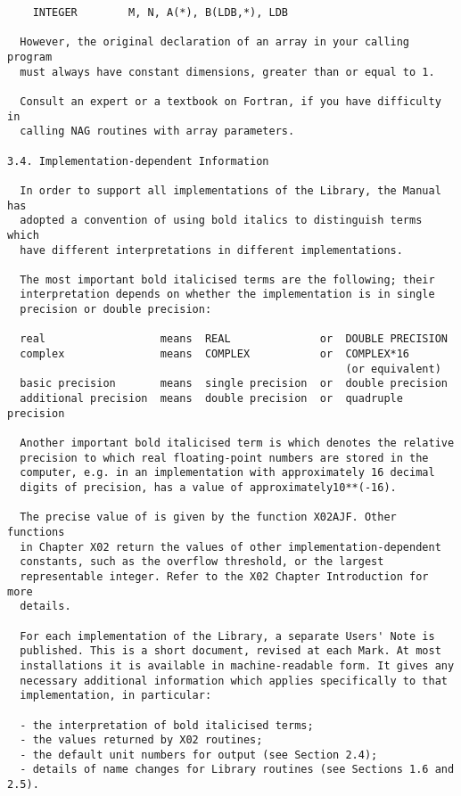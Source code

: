 \begin{verbatim}
    INTEGER        M, N, A(*), B(LDB,*), LDB
 
  However, the original declaration of an array in your calling program
  must always have constant dimensions, greater than or equal to 1.
 
  Consult an expert or a textbook on Fortran, if you have difficulty in
  calling NAG routines with array parameters.
 
3.4. Implementation-dependent Information
 
  In order to support all implementations of the Library, the Manual has
  adopted a convention of using bold italics to distinguish terms which
  have different interpretations in different implementations.
 
  The most important bold italicised terms are the following; their
  interpretation depends on whether the implementation is in single
  precision or double precision:
 
  real                  means  REAL              or  DOUBLE PRECISION
  complex               means  COMPLEX           or  COMPLEX*16
                                                     (or equivalent)
  basic precision       means  single precision  or  double precision
  additional precision  means  double precision  or  quadruple precision
 
  Another important bold italicised term is which denotes the relative
  precision to which real floating-point numbers are stored in the
  computer, e.g. in an implementation with approximately 16 decimal
  digits of precision, has a value of approximately10**(-16).
 
  The precise value of is given by the function X02AJF. Other functions
  in Chapter X02 return the values of other implementation-dependent
  constants, such as the overflow threshold, or the largest
  representable integer. Refer to the X02 Chapter Introduction for more
  details.
 
  For each implementation of the Library, a separate Users' Note is
  published. This is a short document, revised at each Mark. At most
  installations it is available in machine-readable form. It gives any
  necessary additional information which applies specifically to that
  implementation, in particular:
 
  - the interpretation of bold italicised terms;
  - the values returned by X02 routines;
  - the default unit numbers for output (see Section 2.4);
  - details of name changes for Library routines (see Sections 1.6 and 2.5).
 

\end{verbatim}
